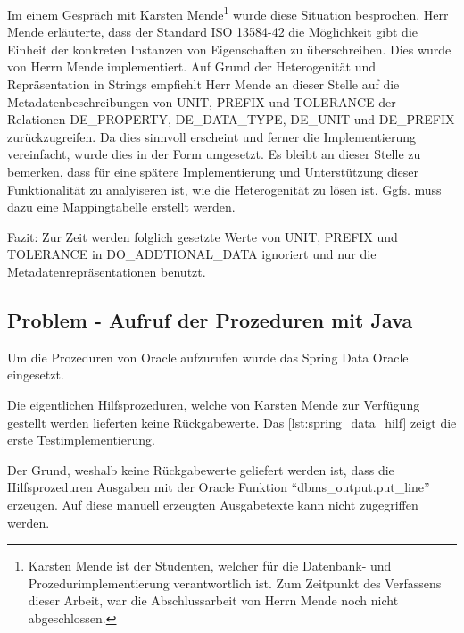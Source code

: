 Im einem Gespräch mit Karsten Mende\footnote{Karsten Mende ist der Studenten, welcher für die Datenbank- und Prozedurimplementierung verantwortlich ist. Zum Zeitpunkt des Verfassens dieser Arbeit, war die Abschlussarbeit von Herrn Mende noch nicht abgeschlossen.} wurde diese Situation besprochen. Herr Mende erläuterte, dass der Standard ISO 13584-42 \citep[vgl.][]{iso13584-42} die Möglichkeit gibt die Einheit der konkreten Instanzen von Eigenschaften zu überschreiben. Dies wurde von Herrn Mende implementiert. Auf Grund der Heterogenität und Repräsentation in Strings empfiehlt Herr Mende an dieser Stelle auf die Metadatenbeschreibungen von UNIT, PREFIX und TOLERANCE der Relationen DE\_PROPERTY, DE\_DATA\_TYPE, DE\_UNIT und DE\_PREFIX zurückzugreifen. 
Da dies sinnvoll erscheint und ferner die Implementierung vereinfacht, wurde dies in der Form umgesetzt. Es bleibt an dieser Stelle zu bemerken, dass für eine spätere Implementierung und Unterstützung dieser Funktionalität zu analyiseren ist, wie die Heterogenität zu lösen ist. Ggfs. muss dazu eine Mappingtabelle erstellt werden.

Fazit:
Zur Zeit werden folglich gesetzte Werte von UNIT, PREFIX und TOLERANCE in DO\_ADDTIONAL\_DATA ignoriert und nur die Metadatenrepräsentationen benutzt.  

\subsection{Problem - Aufruf der Prozeduren mit Java}
Um die Prozeduren von Oracle aufzurufen wurde das Spring Data Oracle eingesetzt. 

Die eigentlichen Hilfsprozeduren, welche von Karsten Mende zur Verfügung gestellt werden lieferten keine Rückgabewerte. Das \autoref{lst:spring_data_hilf} zeigt die erste Testimplementierung. 

Der Grund, weshalb keine Rückgabewerte geliefert werden ist, dass die Hilfsprozeduren Ausgaben mit der Oracle Funktion \enquote{dbms\_output.put\_line} erzeugen. Auf diese manuell erzeugten Ausgabetexte kann nicht zugegriffen werden. 

